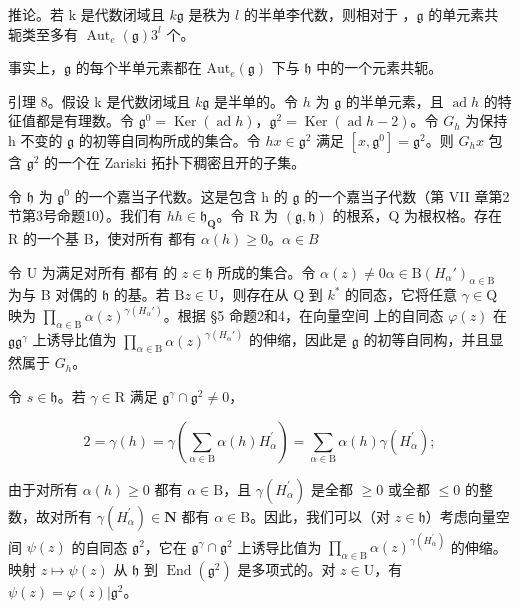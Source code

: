 推论。若 k 是代数闭域且 \(k\)\(\mathfrak{g}\) 是秩为 \(l\) 的半单李代数，则相对于 ，\(\mathfrak{g}\) 的单元素共轭类至多有 \(\operatorname{Aut}_e(\mathfrak{g})\)\(3^l\) 个。

事实上，\(\mathfrak{g}\) 的每个半单元素都在 \(\mathrm{Aut}_e(\mathfrak{g})\) 下与 \(\mathfrak{h}\) 中的一个元素共轭。

引理 8。假设 k 是代数闭域且 \(k\)\(\mathfrak{g}\) 是半单的。令 \(h\) 为 \(\mathfrak{g}\) 的半单元素，且 \(\operatorname{ad} h\) 的特征值都是有理数。令 \(\mathfrak{g}^0 = \operatorname{Ker}(\operatorname{ad} h)\)，\(\mathfrak{g}^2 = \operatorname{Ker}(\operatorname{ad} h - 2)\)。令 \(G_h\) 为保持 h 不变的 \(\mathfrak{g}\) 的初等自同构所成的集合。令 \(h\)\(x \in \mathfrak{g}^2\) 满足 \([x, \mathfrak{g}^0] = \mathfrak{g}^2\)。则 \(G_h x\) 包含 \(\mathfrak{g}^2\) 的一个在 Zariski 拓扑下稠密且开的子集。

令 \(\mathfrak{h}\) 为 \(\mathfrak{g}^0\) 的一个嘉当子代数。这是包含 h 的 \(\mathfrak{g}\) 的一个嘉当子代数（第 VII 章第2节第3号命题10）。我们有 \(h\)\(h \in \mathfrak{h}_{\mathbf{Q}}\)。令 R 为 \((\mathfrak{g}, \mathfrak{h})\) 的根系，Q 为根权格。存在 R 的一个基 B，使对所有  都有 \(\alpha(h) \geq 0\)。\(\alpha \in B\)

令 \(\mathrm{U}\) 为满足对所有  都有  的 \(z \in \mathfrak{h}\) 所成的集合。令 \(\alpha(z) \neq 0\)\(\alpha \in \mathrm{B}\)\((H_{\alpha}')_{\alpha \in \mathrm{B}}\) 为与 B 对偶的 \(\mathfrak{h}\) 的基。若 \(\mathrm{B}\)\(z \in \mathrm{U}\)，则存在从 \(\mathrm{Q}\) 到 \(k^*\) 的同态，它将任意 \(\gamma \in \mathrm{Q}\) 映为 \(\prod_{\alpha \in \mathrm{B}} \alpha(z)^{\gamma(H_{\alpha}')}\)。根据 §5 命题2和4，在向量空间  上的自同态 \(\varphi(z)\) 在 \(\mathfrak{g}\)\(\mathfrak{g}^{\gamma}\) 上诱导比值为 \(\prod_{\alpha \in \mathrm{B}} \alpha(z)^{\gamma(H_{\alpha}')}\) 的伸缩，因此是 \(\mathfrak{g}\) 的初等自同构，并且显然属于 \(G_h\)。

令 \(s \in \mathfrak{h}\)。若 \(\gamma \in \mathrm{R}\) 满足 \(\mathfrak{g}^{\gamma} \cap \mathfrak{g}^{2} \neq 0\)，

\[
2 = \gamma (h) = \gamma \left(\sum_ {\alpha \in \mathrm{B}} \alpha (h) H _ {\alpha} ^ {\prime}\right) = \sum_ {\alpha \in \mathrm{B}} \alpha (h) \gamma (H _ {\alpha} ^ {\prime});
\]

由于对所有 \(\alpha(h) \geq 0\) 都有 \(\alpha \in \mathrm{B}\)，且 \(\gamma(H_{\alpha}^{\prime})\) 是全都 \(\geq 0\) 或全都 \(\leq 0\) 的整数，故对所有 \(\gamma(H_{\alpha}^{\prime}) \in \mathbf{N}\) 都有 \(\alpha \in \mathrm{B}\)。因此，我们可以（对 \(z \in \mathfrak{h}\)）考虑向量空间 \(\psi(z)\) 的自同态 \(\mathfrak{g}^2\)，它在 \(\mathfrak{g}^{\gamma} \cap \mathfrak{g}^2\) 上诱导比值为 \(\prod_{\alpha \in \mathrm{B}} \alpha(z)^{\gamma(H_{\alpha}^{\prime})}\) 的伸缩。映射 \(z \mapsto \psi(z)\) 从 \(\mathfrak{h}\) 到 \(\operatorname{End}(\mathfrak{g}^2)\) 是多项式的。对 \(z \in \mathrm{U}\)，有 \(\psi(z) = \varphi(z)|\mathfrak{g}^2\)。

